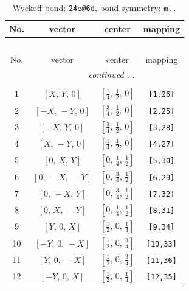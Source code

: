 \documentclass[fleqn,8pt]{jsarticle}
\begin{document}
\begin{longtable}{cccc}
\caption{Wyckoff bond: {\tt 24e@6d}, bond symmetry: {\tt m..}}
 \\
 \hline \hline
No. & vector & center & mapping \\ \hline \endfirsthead

\multicolumn{3}{l}{\tablename\ \thetable{}} \\
 \hline \hline
No. & vector & center & mapping \\ \hline \endhead

 \hline \hline
\multicolumn{3}{r}{\footnotesize\it continued ...} \\ \endfoot

 \hline \hline
\multicolumn{3}{r}{} \\ \endlastfoot

1 & $\left[ X,\, Y,\, 0 \right]$ & $\left[ \frac{1}{4},\, \frac{1}{2},\, 0 \right]$ & {\tt [1,26]} \\ \hline
2 & $\left[ - X,\, - Y,\, 0 \right]$ & $\left[ \frac{3}{4},\, \frac{1}{2},\, 0 \right]$ & {\tt [2,25]} \\ \hline
3 & $\left[ - X,\, Y,\, 0 \right]$ & $\left[ \frac{3}{4},\, \frac{1}{2},\, 0 \right]$ & {\tt [3,28]} \\ \hline
4 & $\left[ X,\, - Y,\, 0 \right]$ & $\left[ \frac{1}{4},\, \frac{1}{2},\, 0 \right]$ & {\tt [4,27]} \\ \hline
5 & $\left[ 0,\, X,\, Y \right]$ & $\left[ 0,\, \frac{1}{4},\, \frac{1}{2} \right]$ & {\tt [5,30]} \\ \hline
6 & $\left[ 0,\, - X,\, - Y \right]$ & $\left[ 0,\, \frac{3}{4},\, \frac{1}{2} \right]$ & {\tt [6,29]} \\ \hline
7 & $\left[ 0,\, - X,\, Y \right]$ & $\left[ 0,\, \frac{3}{4},\, \frac{1}{2} \right]$ & {\tt [7,32]} \\ \hline
8 & $\left[ 0,\, X,\, - Y \right]$ & $\left[ 0,\, \frac{1}{4},\, \frac{1}{2} \right]$ & {\tt [8,31]} \\ \hline
9 & $\left[ Y,\, 0,\, X \right]$ & $\left[ \frac{1}{2},\, 0,\, \frac{1}{4} \right]$ & {\tt [9,34]} \\ \hline
10 & $\left[ - Y,\, 0,\, - X \right]$ & $\left[ \frac{1}{2},\, 0,\, \frac{3}{4} \right]$ & {\tt [10,33]} \\ \hline
11 & $\left[ Y,\, 0,\, - X \right]$ & $\left[ \frac{1}{2},\, 0,\, \frac{3}{4} \right]$ & {\tt [11,36]} \\ \hline
12 & $\left[ - Y,\, 0,\, X \right]$ & $\left[ \frac{1}{2},\, 0,\, \frac{1}{4} \right]$ & {\tt [12,35]} \\ \hline

\end{longtable}
\end{document}
